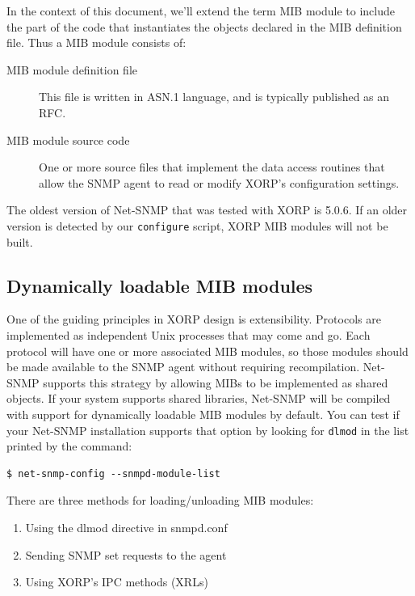 \documentclass[11pt]{article}
\begin{document}
In the context of this document, we'll extend the term MIB module to include
the part of the code that instantiates the objects declared in the MIB
definition file.  Thus a MIB module consists of:

\begin{description}

  \item[MIB module definition file] This file is written in ASN.1 language,
  and is typically published as an RFC.

  \item[MIB module source code] One or more source files that implement the
  data access routines that allow the SNMP agent to read or modify XORP's
  configuration settings. 

\end{description} 

The oldest version of Net-SNMP that was tested with XORP is 5.0.6.  If an
older version is detected by our \texttt{configure} script, XORP MIB modules
will not be built.

\subsection{Dynamically loadable MIB modules}
\label{sec:MIB_module_format}

One of the guiding principles in XORP design is extensibility.  Protocols are
implemented as independent Unix processes that may come and go.  Each protocol
will have one or more associated MIB modules, so those modules should be made
available to the SNMP agent without requiring recompilation.  Net-SNMP supports
this strategy by allowing MIBs to be implemented as shared objects.  If your
system supports shared libraries, Net-SNMP will be compiled with support for
dynamically loadable MIB modules by default.  You can test if your Net-SNMP
installation supports that option by looking for \texttt{dlmod} in the list
printed by the command:

\begin{verbatim}
$ net-snmp-config --snmpd-module-list
\end{verbatim}


There are three methods for loading/unloading MIB modules:  

\begin{enumerate}
  \item Using the dlmod directive in snmpd.conf 
  \item Sending SNMP set requests to the agent
  \item Using XORP's IPC methods (XRLs)
\end{enumerate}
\end{document}
